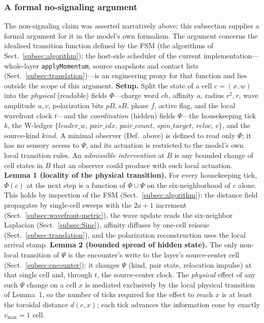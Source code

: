 \documentclass{ijuc}
\begin{document}
\subsubsection{A formal no-signaling argument}\label{subsec:nosignaling-formal}
The non-signaling claim was asserted narratively above; this subsection supplies a formal argument for it in the model's own formalism.  The argument concerns the idealised transition function defined by the FSM (the algorithms of Sect.~\ref{subsec:algorithm}); the host-side scheduler of the current implementation---whole-layer \texttt{applyMomentum}, source snapshots and contact lists (Sect.~\ref{subsec:translation})---is an engineering proxy for that function and lies outside the scope of this argument.
\textbf{Setup.}  Split the state of a cell $c=(x,w)$ into the \emph{physical} (readable) fields $\Phi$---charge word $ch$, affinity $a$, radius $r^{2},r$, wave amplitude $u,v$, polarization bits $pB,sB$, phase $f$, active flag, and the local wavefront clock $t$---and the \emph{coordination} (hidden) fields $\Psi$---the housekeeping tick $k$, the W-ledger $\{leader\_w,\,pair\_idx,\,pair\_count,\,spin\_target,\,reloc,\,c\}$, and the source-kind $kind$.  A minimal observer (Def.~above) is defined to read only $\Phi$; it has no sensory access to $\Psi$, and its actuation is restricted to the model's own local transition rules.  An \emph{admissible intervention} at $B$ is any bounded change of cell states in $B$ that an observer could produce with such local actuation.
\textbf{Lemma 1 (locality of the physical transition).}  For every housekeeping tick, $\Phi(c)$ at the next step is a function of $\Phi\cup\Psi$ on the six-neighborhood of $c$ alone.  This holds by inspection of the FSM (Sect.~\ref{subsec:algorithm}): the distance field propagates by single-cell sweeps with the $2a+1$ increment (Sect.~\ref{subsec:wavefront-metric}), the wave update reads the six-neighbor Laplacian (Sect.~\ref{subsec:Sine}), affinity diffuses by one-cell reissue (Sect.~\ref{subsec:translation}), and the polarization reconstruction uses the local arrival stamp.
\textbf{Lemma 2 (bounded spread of hidden state).}  The only non-local transition of $\Psi$ is the encounter's write to the layer's source-center cell (Sect.~\ref{subsec:encounter}); it changes $\Psi$ (kind, pair state, relocation impulse) at that single cell and, through $t$, the source-center clock.  The \emph{physical} effect of any such $\Psi$ change on a cell $x$ is mediated exclusively by the local physical transition of Lemma~1, so the number of ticks required for the effect to reach $x$ is at least the toroidal distance $d(c,x)$; each tick advances the information cone by exactly $v_{\max}=1$ cell.
\end{document}
